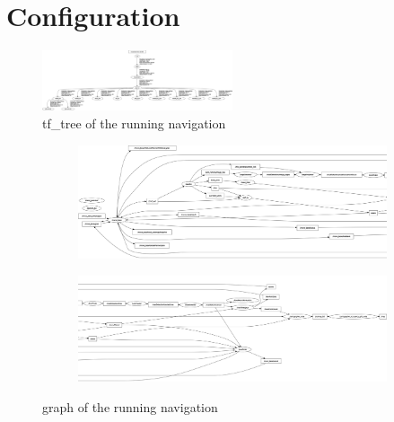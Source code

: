 \chapter{Configuration}
\label{config}

\begin{figure}
	\includegraphics[angle=90, width=0.5\textwidth]{Pictures/tf tree}
	\caption{tf\_tree of the running navigation}
 	\label{tftree concept}
\end{figure}

\newpage

\begin{figure}
	\centering
	\begin{subfigure}{.45\textwidth}
		\includegraphics[angle=90, width=\linewidth]{Pictures/rosgraphleft}
	\end{subfigure}
	\begin{subfigure}{.45\textwidth}
		\includegraphics[angle=90, width=\linewidth]{Pictures/rosgraphright}
	\end{subfigure}
	\caption{graph of the running navigation}
	
 	\label{graph concept}
\end{figure}